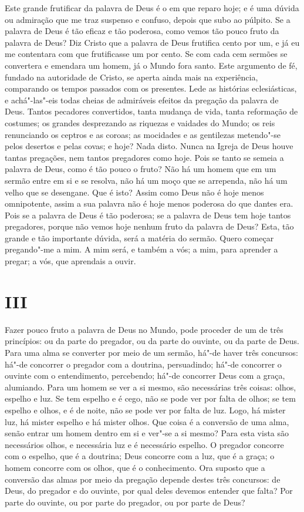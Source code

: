 Este grande frutificar da palavra de Deus é o em que reparo hoje; e é
uma dúvida ou admiração que me traz suspenso e confuso, depois que
subo ao púlpito. Se a palavra de Deus é tão eficaz e tão poderosa, como
vemos tão pouco fruto da palavra de Deus? Diz Cristo que a palavra de
Deus frutifica cento por um, e já eu me contentara com que frutificasse
um por cento. Se com cada cem sermões se convertera e emendara um homem,
já o Mundo fora santo. Este argumento de fé, fundado na autoridade de
Cristo, se
aperta ainda mais na experiência, comparando os tempos passados com os
presentes. Lede as histórias eclesiásticas, e achá"-las"-eis todas cheias
de admiráveis efeitos da pregação da palavra de Deus. Tantos pecadores
convertidos, tanta mudança de vida, tanta reformação de costumes; os
grandes desprezando as riquezas e vaidades do Mundo; os reis renunciando
os ceptros e as coroas; as mocidades e as gentilezas metendo"-se pelos
desertos e pelas covas; e hoje? Nada disto. Nunca na Igreja de Deus
houve tantas pregações, nem tantos pregadores como hoje. Pois se tanto
se semeia a palavra de Deus, como é tão pouco o fruto? Não há um homem
que em um sermão entre em si e se resolva, não há um moço que se
arrependa, não há um velho que se desengane. Que é isto? Assim como Deus
não é hoje menos omnipotente, assim a sua palavra não é hoje menos
poderosa do que dantes era. Pois se a palavra de Deus é tão poderosa; se
a palavra de Deus tem hoje tantos pregadores, porque não vemos hoje
nenhum fruto da palavra de Deus? Esta, tão grande e tão importante
dúvida, será a matéria do sermão. Quero começar pregando"-me a mim. A mim
será, e também a vós; a mim, para aprender a pregar; a vós, que
aprendais a ouvir.

\section*{III}

Fazer pouco fruto a palavra de Deus no Mundo, pode proceder de um de
três princípios: ou da parte do pregador, ou da parte do ouvinte, ou da
parte de Deus. Para uma alma se converter por meio de um sermão, há"-de
haver três concursos: há"-de concorrer o pregador com a doutrina,
persuadindo; há"-de concorrer o ouvinte com o entendimento, percebendo;
há"-de concorrer Deus com a graça, alumiando. Para um homem se ver a si
mesmo, são necessárias três coisas: olhos, espelho e luz. Se tem
espelho e é cego, não se pode ver por falta de olhos; se tem espelho e
olhos, e é de noite, não se pode ver por falta de luz. Logo, há mister
luz, há mister espelho e há mister olhos. Que coisa é a conversão de uma
alma, senão entrar um homem dentro em si e ver"-se a si mesmo? Para esta
vista são necessários olhos, e necessária luz e é necessário espelho.
O pregador concorre com o espelho, que é a doutrina; Deus concorre com a
luz, que é a graça; o homem concorre com
os olhos, que é o conhecimento. Ora suposto que a conversão das almas
por meio da pregação depende destes três concursos: de Deus, do pregador
e do ouvinte, por qual deles devemos entender que falta? Por parte do
ouvinte, ou por parte do pregador, ou por parte de Deus?

